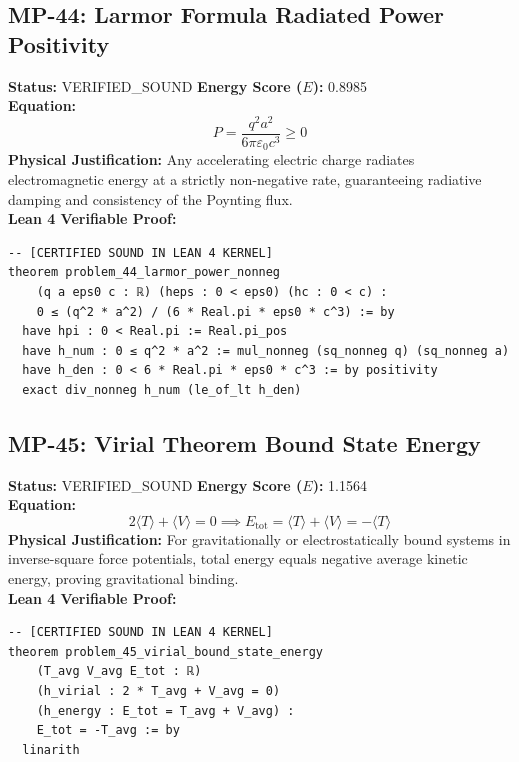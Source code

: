 \documentclass[11pt, a4paper]{article}
\begin{document}
\subsection{MP-44: Larmor Formula Radiated Power Positivity}
\textbf{Status:} VERIFIED\_SOUND \hfill \textbf{Energy Score ($E$):} 0.8985\\
\textbf{Equation:}
\begin{equation*}
P = \frac{q^2 a^2}{6\pi \varepsilon_0 c^3} \ge 0
\end{equation*}
\textbf{Physical Justification:} Any accelerating electric charge radiates electromagnetic energy at a strictly non-negative rate, guaranteeing radiative damping and consistency of the Poynting flux.\\
\textbf{Lean 4 Verifiable Proof:}
\begin{verbatim}
-- [CERTIFIED SOUND IN LEAN 4 KERNEL]
theorem problem_44_larmor_power_nonneg
    (q a eps0 c : ℝ) (heps : 0 < eps0) (hc : 0 < c) :
    0 ≤ (q^2 * a^2) / (6 * Real.pi * eps0 * c^3) := by
  have hpi : 0 < Real.pi := Real.pi_pos
  have h_num : 0 ≤ q^2 * a^2 := mul_nonneg (sq_nonneg q) (sq_nonneg a)
  have h_den : 0 < 6 * Real.pi * eps0 * c^3 := by positivity
  exact div_nonneg h_num (le_of_lt h_den)

\end{verbatim}

\subsection{MP-45: Virial Theorem Bound State Energy}
\textbf{Status:} VERIFIED\_SOUND \hfill \textbf{Energy Score ($E$):} 1.1564\\
\textbf{Equation:}
\begin{equation*}
2\langle T \rangle + \langle V \rangle = 0 \implies E_{\text{tot}} = \langle T \rangle + \langle V \rangle = -\langle T \rangle
\end{equation*}
\textbf{Physical Justification:} For gravitationally or electrostatically bound systems in inverse-square force potentials, total energy equals negative average kinetic energy, proving gravitational binding.\\
\textbf{Lean 4 Verifiable Proof:}
\begin{verbatim}
-- [CERTIFIED SOUND IN LEAN 4 KERNEL]
theorem problem_45_virial_bound_state_energy
    (T_avg V_avg E_tot : ℝ)
    (h_virial : 2 * T_avg + V_avg = 0)
    (h_energy : E_tot = T_avg + V_avg) :
    E_tot = -T_avg := by
  linarith

\end{verbatim}
\end{document}
